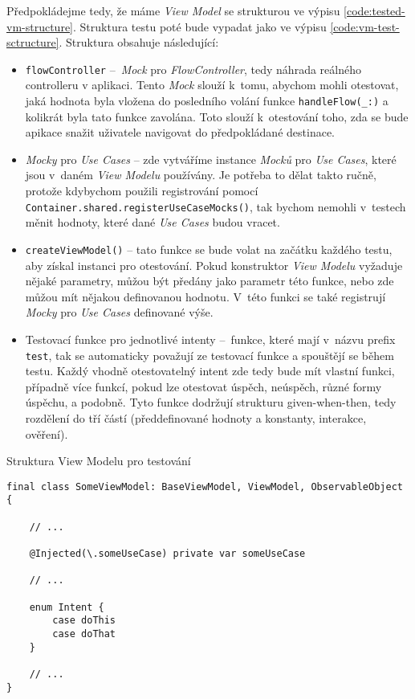 Předpokládejme tedy, že máme \emph{View Model} se strukturou ve výpisu \ref{code:tested-vm-structure}. Struktura testu poté bude vypadat jako ve výpisu \ref{code:vm-test-sctructure}. Struktura obsahuje následující:
\begin{itemize}
\item\texttt{flowController} – \emph{Mock} pro \emph{FlowController}, tedy náhrada reálného controlleru v aplikaci. Tento \emph{Mock} slouží k~tomu, abychom mohli otestovat, jaká hodnota byla vložena do posledního volání funkce \texttt{handleFlow(\_:)} a kolikrát byla tato funkce zavolána. Toto slouží k~otestování toho, zda se bude apikace snažit uživatele navigovat do předpokládané destinace.
\item\emph{Mocky} pro \emph{Use Cases} – zde vytváříme instance \emph{Mocků} pro \emph{Use Cases}, které jsou v~daném \emph{View Modelu} používány. Je potřeba to dělat takto ručně, protože kdybychom použili registrování pomocí \texttt{Container.shared.registerUseCaseMocks()}, tak bychom nemohli v~testech měnit hodnoty, které dané \emph{Use Cases} budou vracet.
\item\texttt{createViewModel()} – tato funkce se bude volat na začátku každého testu, aby získal instanci pro otestování. Pokud konstruktor \emph{View Modelu} vyžaduje nějaké parametry, můžou být předány jako parametr této funkce, nebo zde můžou mít nějakou definovanou hodnotu. V~této funkci se také registrují \emph{Mocky} pro \emph{Use Cases} definované výše.
\item Testovací funkce pro jednotlivé intenty – funkce, které mají v~názvu prefix \texttt{test}, tak se automaticky považují ze testovací funkce a spouštějí se během testu. Každý vhodně otestovatelný intent zde tedy bude mít vlastní funkci, případně více funkcí, pokud lze otestovat úspěch, neúspěch, různé formy úspěchu, a podobně. Tyto funkce dodržují strukturu given-when-then, tedy rozdělení do tří částí (předdefinované hodnoty a konstanty, interakce, ověření).
\end{itemize}

\begin{listing}
\caption{Struktura View Modelu pro testování}\label{code:tested-vm-structure}
\begin{verbatim}
final class SomeViewModel: BaseViewModel, ViewModel, ObservableObject {
	
    // ...
	
    @Injected(\.someUseCase) private var someUseCase
	
    // ...
	
    enum Intent {
        case doThis
        case doThat
    }
	
    // ...
}
\end{verbatim}
\end{listing}

